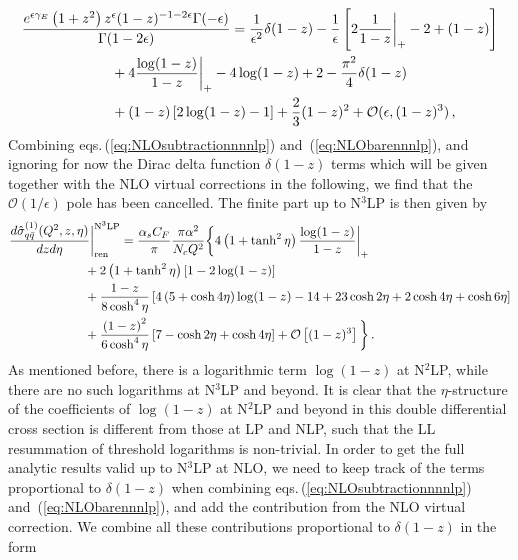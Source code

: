 \documentclass[11pt]{article}
\newcommand\eqns[2]    {eqs.\,(\ref{#1}) and~(\ref{#2})}
\begin{document}
%
\begin{align}
    \frac{e^{\epsilon\gamma_E}\left(1+z^2\right)z^{\epsilon}(1-z)^{-1-2\epsilon}\Gamma(-\epsilon)}{\Gamma(1-2\epsilon)} &= \frac{1}{\epsilon^2}\delta(1-z)-\frac{1}{\epsilon}\left[2\frac{1}{1-z}\bigg|_+-2+(1-z)\right] \nonumber \\ 
    &\hspace{-3cm}+4\frac{\log(1-z)}{1-z}\bigg|_+-4\log(1-z)+2-\frac{\pi^2}{4}\delta(1-z) \nonumber \\ 
    &\hspace{-3cm}+(1-z)\left[2\log(1-z)-1\right]+\frac{2}{3}(1-z)^2+\mathcal{O}(\epsilon,(1-z)^3)\,,
\end{align}
%
Combining \eqns{eq:NLOsubtractionnnnlp}{eq:NLObarennnlp}, and ignoring for now the Dirac delta function $\delta(1-z)$ terms which will be given together with the NLO virtual corrections in the following, we find that the $\mathcal{O}(1/\epsilon)$ pole has been cancelled. The finite part up to N$^3$LP is then given by
%
\begin{align}\label{eq:finteNNNLP}
    \frac{d\hat{\sigma}_{q\bar{q}}^{(1)}(Q^2,z,\eta)}{dzd\eta}\bigg|_{\text{ren}}^{\text{N}^3\text{LP}} &= \frac{\alpha_sC_F}{\pi}\frac{\pi\alpha^2}{N_c Q^2} \bigg\{4\left(1+\tanh^2\eta\right)\frac{\log(1-z)}{1-z}\bigg|_+ \nonumber \\ 
    &\hspace{-1cm}+2\left(1+\tanh^2\eta\right)\left[1-2 \log(1-z)\right] \nonumber \\ 
    &\hspace{-1cm}+\frac{1-z}{8\cosh^4\eta}\left[4\left(5+\cosh4\eta\right)\log(1-z)-14+23\cosh2\eta+2\cosh4\eta+\cosh6\eta\right] \nonumber \\ 
    &\hspace{-1cm}+\frac{\left(1-z\right)^2}{6\cosh^4\eta}\left[7-\cosh2\eta + \cosh4\eta\right] + \mathcal{O}\left[(1-z)^3\right]\bigg\}\,.
\end{align}
%
As mentioned before, there is a logarithmic term $\log(1-z)$ at N$^2$LP, while there are no such logarithms at N$^3$LP and beyond. It is clear that the $\eta$-structure of the coefficients of $\log(1-z)$ at N$^2$LP and beyond in this double differential cross section is different from those at LP and NLP, such that the LL resummation of threshold logarithms is non-trivial.
In order to get the full analytic results valid up to N$^3$LP at NLO, we need to keep track of the terms proportional to $\delta(1-z)$ when combining \eqns{eq:NLOsubtractionnnnlp}{eq:NLObarennnlp}, and add the contribution from the NLO virtual correction. We combine all these contributions proportional to $\delta(1-z)$ in the form
\end{document}
